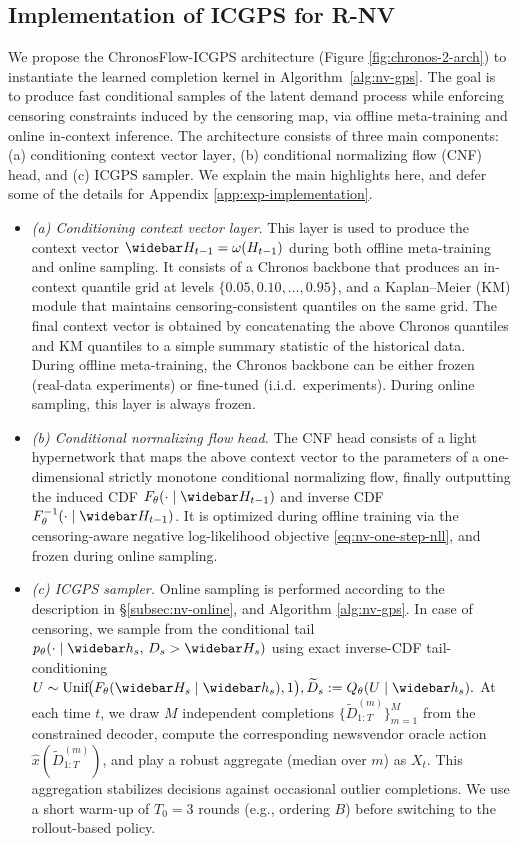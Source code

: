 \documentclass[11pt]{article}
\begin{document}
\subsection{Implementation of ICGPS for R-NV}
\label{subsec:exp-implementation}
We propose the ChronosFlow-ICGPS architecture (Figure \ref{fig:chronos-2-arch}) to instantiate the learned completion kernel in Algorithm~\ref{alg:nv-gps}. The goal is to produce
fast conditional samples of the latent demand process while enforcing censoring constraints induced by the
censoring map, via offline meta-training and online in-context inference. The architecture consists of three main components: (a) conditioning context vector layer, (b) conditional normalizing flow (CNF) head, and (c) ICGPS sampler. We explain the main highlights here, and defer some of the details for Appendix \ref{app:exp-implementation}.
\begin{itemize}[leftmargin=*]
\item \emph{(a) Conditioning context vector layer}. This layer is used to produce the context vector $\widebar H_{t-1} = \omega(H_{t-1})$ during both offline meta-training and online sampling. It consists of a Chronos backbone that produces an in-context quantile grid at levels \(\{0.05,0.10,\ldots,0.95\}\), and a Kaplan--Meier (KM) module that maintains censoring-consistent quantiles on the same grid. The final context vector is obtained by concatenating the above Chronos quantiles and KM quantiles to a simple
summary statistic of the historical data. 
During offline meta-training, the Chronos backbone can be either frozen (real-data experiments) or fine-tuned (i.i.d.\ experiments). During online sampling, this layer is always frozen.
\item \emph{(b) Conditional normalizing flow head.} The CNF head consists of a light hypernetwork that maps the above context vector to the parameters of a one-dimensional strictly monotone conditional normalizing flow, finally outputting the induced CDF $F_\theta (\cdot \mid \widebar H_{t-1})$ and inverse CDF $F^{-1}_\theta(\cdot \mid \widebar H_{t-1})$. It is optimized during offline training via the censoring-aware negative log-likelihood objective \eqref{eq:nv-one-step-nll}, and frozen during online sampling.

\item \emph{(c) ICGPS sampler.}
Online sampling is performed according to the description in \S\ref{subsec:nv-online}, and Algorithm \ref{alg:nv-gps}. In case of censoring, we sample from the conditional tail \(p_\theta(\cdot\mid \widebar h_s,\,D_s>\widebar H_s)\) using exact inverse-CDF tail-conditioning $U\sim \mathrm{Unif}\!\big(F_\theta(\widebar H_s\mid \widebar h_s),1\big), \widetilde D_s := Q_\theta(U\mid \widebar h_s).$ At each time \(t\), we draw \(M\) independent completions
\(\{\widetilde D^{(m)}_{1:T}\}_{m=1}^M\) from the constrained decoder, compute the corresponding newsvendor
oracle action \(\widehat x(\widetilde D^{(m)}_{1:T})\), and play a robust
aggregate (median over \(m\)) as \(X_t\). This aggregation stabilizes decisions against occasional
outlier completions. We use a short warm-up of \(T_0=3\) rounds (e.g.,
ordering \(B\)) before switching to the rollout-based policy.
\end{itemize}
\end{document}
